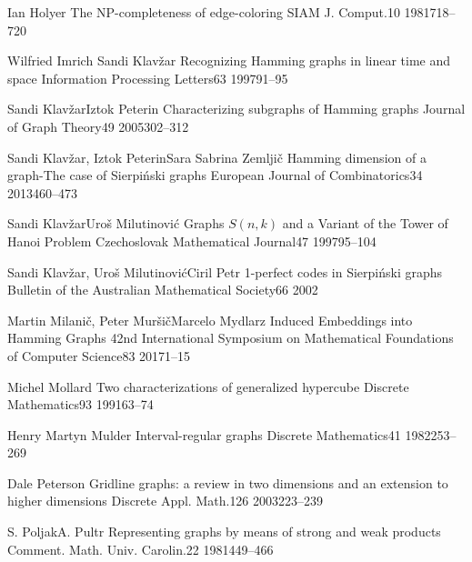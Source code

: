 \documentclass[12pt,a4paper,titlepage,openany]{report}
\begin{document}
\begin{thebibliography}{99}
\articleInJournalOneAuthor
    {Ian Holyer}
    {The NP-completeness of edge-coloring}
   {SIAM J. Comput.}{10}
   {1981}{718--720}

  \articleInJournalManyAuthors
    {Wilfried Imrich} {Sandi Klav\v zar}
    {Recognizing Hamming graphs in linear time and space}
   {Information Processing Letters}{63}
   {1997}{91--95}

  \articleInJournalManyAuthors
    {Sandi Klav\v zar}{Iztok Peterin}
    {Characterizing subgraphs of Hamming graphs}
   {Journal of Graph Theory}{49}
   {2005}{302--312}

  \articleInJournalManyAuthors
    {Sandi Klav\v zar, Iztok Peterin}{Sara Sabrina Zemlji\v c}
    {Hamming dimension of a graph-The case of Sierpi\'nski graphs}
   {European Journal of Combinatorics}{34}
   {2013}{460--473}

  \articleInJournalManyAuthors
    {Sandi Klav\v zar}{Uro\v s Milutinovi\' c}
    {Graphs $S(n, k)$ and a Variant of the Tower of Hanoi Problem}
   {Czechoslovak Mathematical Journal}{47}
   {1997}{95--104}

  \articleInJournalManyAuthors
    {Sandi Klav\v zar, Uro\v s Milutinovi\' c}{Ciril Petr}
    {1-perfect codes in Sierpi\' nski graphs}
   {Bulletin of the Australian Mathematical Society}{66}
   {2002}{}


  \articleInJournalManyAuthors
    {Martin Milani\v c, Peter Mur\v si\v c}{Marcelo Mydlarz}
    {Induced Embeddings into Hamming Graphs}
   {42nd International Symposium on Mathematical Foundations of Computer Science}{83}
   {2017}{1--15}

  \articleInJournalOneAuthor
    {Michel Mollard}
    {Two characterizations of generalized hypercube}
   {Discrete Mathematics}{93}
   {1991}{63--74}

  \articleInJournalOneAuthor
    {Henry Martyn Mulder}
    {Interval-regular graphs}
   {Discrete Mathematics}{41}
   {1982}{253--269}

\articleInJournalOneAuthor
    {Dale Peterson}
    {Gridline graphs: a review in two dimensions and an extension to higher dimensions}
   {Discrete Appl. Math.}{126}
   {2003}{223--239}


  \articleInJournalManyAuthors
    {S. Poljak}{A. Pultr}
    {Representing graphs by means of strong and weak products}
   {Comment. Math. Univ. Carolin.}{22}
   {1981}{449--466}



\end{thebibliography}
\end{document}
